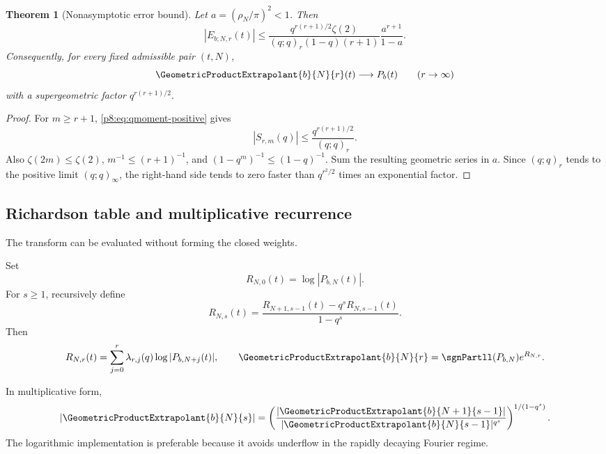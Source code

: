 \documentclass[11pt]{article}
\numberwithin{equation}{section}
\newtheorem{theorem}{Theorem}[section]
\theoremstyle{definition}
\theoremstyle{remark}
\begin{document}
\begin{theorem}[Nonasymptotic error bound]
\label{p8:thm:error-bound}
Let $a=(\rho_N/\pi)^2<1$. Then
\begin{equation}
|E_{b;N,r}(t)|
\le
\frac{q^{r(r+1)/2}\zeta(2)}
{(q;q)_r(1-q)(r+1)}
\frac{a^{r+1}}{1-a}.
\label{p8:eq:error-bound}
\end{equation}
Consequently, for every fixed admissible pair $(t,N)$,
\begin{equation}
\GeometricProductExtrapolant{b}{N}{r}(t)\longrightarrow P_b(t)
\qquad(r\to\infty)
\label{p8:eq:r-convergence}
\end{equation}
with a supergeometric factor $q^{r(r+1)/2}$.
\end{theorem}

\begin{proof}
For $m\ge r+1$, \cref{p8:eq:qmoment-positive} gives
\[
|S_{r,m}(q)|\le\frac{q^{r(r+1)/2}}{(q;q)_r}.
\]
Also $\zeta(2m)\le\zeta(2)$, $m^{-1}\le(r+1)^{-1}$, and $(1-q^m)^{-1}\le(1-q)^{-1}$. Sum the resulting geometric series in $a$. Since $(q;q)_r$ tends to the positive limit $(q;q)_\infty$, the right-hand side tends to zero faster than $q^{r^2/2}$ times an exponential factor.
\end{proof}

\subsection{Richardson table and multiplicative recurrence}

The transform can be evaluated without forming the closed weights.

\begin{algorithm}
\label{p8:alg:rich-table}
Set
\[
R_{N,0}(t)=\log|P_{b,N}(t)|.
\]
For $s\ge1$, recursively define
\begin{equation}
R_{N,s}(t)=
\frac{R_{N+1,s-1}(t)-q^sR_{N,s-1}(t)}{1-q^s}.
\label{p8:eq:rich-recursion}
\end{equation}
Then
\begin{equation}
R_{N,r}(t)=\sum_{j=0}^{r}\lambda_{r,j}(q)
\log|P_{b,N+j}(t)|,
\qquad
\GeometricProductExtrapolant{b}{N}{r}=\sgnPartll(P_{b,N})e^{R_{N,r}}.
\label{p8:eq:rich-table-result}
\end{equation}
\end{algorithm}

In multiplicative form,
\begin{equation}
|\GeometricProductExtrapolant{b}{N}{s}|
=\left(
\frac{|\GeometricProductExtrapolant{b}{N+1}{s-1}|}
{|\GeometricProductExtrapolant{b}{N}{s-1}|^{q^s}}
\right)^{1/(1-q^s)}.
\label{p8:eq:multiplicative-recursion}
\end{equation}
The logarithmic implementation is preferable because it avoids underflow in the rapidly decaying Fourier regime.
\end{document}

